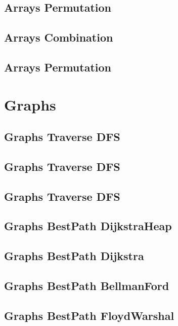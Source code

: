 \subsection{Arrays Permutation}
\raggedbottom
\hrulefill
\subsection{Arrays Combination}
\raggedbottom
\hrulefill
\subsection{Arrays Permutation}
\raggedbottom
\hrulefill

\section{Graphs}
\subsection{Graphs Traverse DFS}
\raggedbottom
\hrulefill
\subsection{Graphs Traverse DFS}
\raggedbottom
\hrulefill
\subsection{Graphs Traverse DFS}
\raggedbottom
\hrulefill
\subsection{Graphs BestPath DijkstraHeap}
\raggedbottom
\hrulefill
\subsection{Graphs BestPath Dijkstra}
\raggedbottom
\hrulefill
\subsection{Graphs BestPath BellmanFord}
\raggedbottom
\hrulefill
\subsection{Graphs BestPath FloydWarshal}
\raggedbottom
\hrulefill

